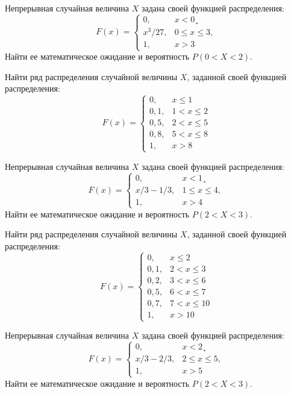 \vfill

\z Непрерывная случайная величина $X$ задана своей функцией распределения: $$ F(x) = \begin{cases}0, & x < 0¸\\ x^3/27, & 0 \leqslant x \leqslant 3, \\ 1, & x > 3 \end{cases} $$ Найти ее математическое ожидание и вероятность $P(0 < X < 2)$.
 

\vfill

\newpage\setcounter{zad}{0}

\z Найти ряд распределения случайной величины $X$, заданной своей функцией распределения: $$ F(x) = \begin{cases}0, & x \leqslant 1 \\ 0{,}1, & 1 < x \leqslant 2 \\ 0{,}5, & 2 < x \leqslant 5 \\ 0{,}8, & 5 < x \leqslant 8 \\ 1, & x > 8 \end{cases} $$


\vfill

\z Непрерывная случайная величина $X$ задана своей функцией распределения: $$ F(x) = \begin{cases}0, & x < 1¸\\ x/3-1/3, & 1 \leqslant x \leqslant 4, \\ 1, & x > 4 \end{cases} $$ Найти ее математическое ожидание и вероятность $P(2 < X < 3)$.
 

\vfill

\newpage\setcounter{zad}{0}

\z Найти ряд распределения случайной величины $X$, заданной своей функцией распределения: $$ F(x) = \begin{cases}0, & x \leqslant 2 \\ 0{,}1, & 2 < x \leqslant 3 \\ 0{,}2, & 3 < x \leqslant 6 \\ 0{,}5, & 6 < x \leqslant 7 \\ 0{,}7, & 7 < x \leqslant 10 \\ 1, & x > 10 \end{cases} $$


\vfill

\z Непрерывная случайная величина $X$ задана своей функцией распределения: $$ F(x) = \begin{cases}0, & x < 2¸\\ x/3-2/3, & 2 \leqslant x \leqslant 5, \\ 1, & x > 5 \end{cases} $$ Найти ее математическое ожидание и вероятность $P(2 < X < 3)$.
 

\vfill

\newpage\setcounter{zad}{0}